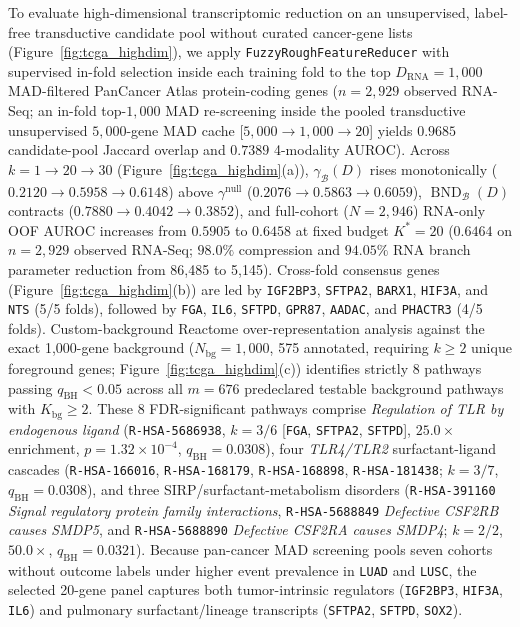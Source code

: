 \documentclass[10pt,twocolumn]{article}
\begin{document}
To evaluate high-dimensional transcriptomic reduction on an unsupervised, label-free
transductive candidate pool without curated cancer-gene lists (Figure~\ref{fig:tcga_highdim}),
we apply \texttt{FuzzyRough\allowbreak Feature\allowbreak Reducer} with supervised in-fold
selection inside each training fold to the top $D_{\text{RNA}}=1,000$ MAD-filtered PanCancer
Atlas protein-coding genes ($n=2,929$ observed RNA-Seq; an in-fold top-$1,000$ MAD re-screening
inside the pooled transductive unsupervised $5,000$-gene MAD cache [$5,000 \to 1,000 \to 20$]
yields $0.9685$ candidate-pool Jaccard overlap and $0.7389$ 4-modality AUROC). Across $k=1 \to
20 \to 30$ (Figure~\ref{fig:tcga_highdim}(a)), $\gamma_{\mathcal{B}}(D)$ rises monotonically
($0.2120 \to 0.5958 \to 0.6148$) above $\gamma^{\text{null}}$ ($0.2076 \to 0.5863 \to 0.6059$),
$\operatorname{BND}_{\mathcal{B}}(D)$ contracts ($0.7880 \to 0.4042 \to 0.3852$), and
full-cohort ($N=2,946$) RNA-only OOF AUROC increases from $0.5905$ to $0.6458$ at fixed budget
$K^*=20$ ($0.6464$ on $n=2,929$ observed RNA-Seq; $98.0\%$ compression and $94.05\%$ RNA branch
parameter reduction from 86,485 to 5,145). Cross-fold consensus genes
(Figure~\ref{fig:tcga_highdim}(b)) are led by \texttt{IGF2BP3}, \texttt{SFTPA2},
\texttt{BARX1}, \texttt{HIF3A}, and \texttt{NTS} (5/5 folds), followed by \texttt{FGA},
\texttt{IL6}, \texttt{SFTPD}, \texttt{GPR87}, \texttt{AADAC}, and \texttt{PHACTR3} (4/5 folds).
Custom-background Reactome over-representation analysis against the exact 1,000-gene background
($N_{\text{bg}}=1,000$, 575 annotated, requiring $k \ge 2$ unique foreground genes;
Figure~\ref{fig:tcga_highdim}(c)) \cite{milacic2024reactome} identifies strictly $8$ pathways
passing $q_{\text{BH}}<0.05$ across all $m=676$ predeclared testable background pathways with
$K_{\text{bg}}\ge 2$. These $8$ FDR-significant pathways comprise \textit{Regulation of TLR by
endogenous ligand} (\texttt{R-HSA-5686938}, $k=3/6$ [\texttt{FGA}, \texttt{SFTPA2},
\texttt{SFTPD}], $25.0\times$ enrichment, $p=1.32\times 10^{-4}$, $q_{\text{BH}}=0.0308$), four
\textit{TLR4/TLR2} surfactant-ligand cascades (\texttt{R-HSA-166016}, \texttt{R-HSA-168179},
\texttt{R-HSA-168898}, \texttt{R-HSA-181438}; $k=3/7$, $q_{\text{BH}}=0.0308$), and three
SIRP/surfactant-metabolism disorders (\texttt{R-HSA-391160} \textit{Signal regulatory protein
family interactions}, \texttt{R-HSA-5688849} \textit{Defective CSF2RB causes SMDP5}, and
\texttt{R-HSA-5688890} \textit{Defective CSF2RA causes SMDP4}; $k=2/2$, $50.0\times$,
$q_{\text{BH}}=0.0321$). Because pan-cancer MAD screening pools seven cohorts without outcome
labels under higher event prevalence in \texttt{LUAD} and \texttt{LUSC}, the selected 20-gene
panel captures both tumor-intrinsic regulators (\texttt{IGF2BP3}, \texttt{HIF3A}, \texttt{IL6})
and pulmonary surfactant/lineage transcripts (\texttt{SFTPA2}, \texttt{SFTPD}, \texttt{SOX2}).
\end{document}
